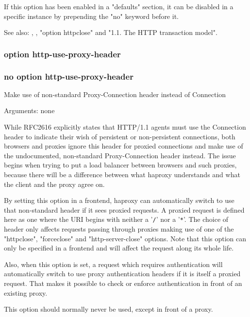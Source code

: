   If this option has been enabled in a "defaults" section, it can be disabled
  in a specific instance by prepending the "no" keyword before it.

  See also: , ,
             "option httpclose" and "1.1. The HTTP transaction model".

\subsubsection{option http-use-proxy-header}
\subsubsection{no option http-use-proxy-header}


  Make use of non-standard Proxy-Connection header instead of Connection


  Arguments: none

  While RFC2616 explicitly states that HTTP/1.1 agents must use the
  Connection header to indicate their wish of persistent or non-persistent
  connections, both browsers and proxies ignore this header for proxied
  connections and make use of the undocumented, non-standard Proxy-Connection
  header instead. The issue begins when trying to put a load balancer between
  browsers and such proxies, because there will be a difference between what
  haproxy understands and what the client and the proxy agree on.

  By setting this option in a frontend, haproxy can automatically switch to use
  that non-standard header if it sees proxied requests. A proxied request is
  defined here as one where the URI begins with neither a '\verb|/|' nor a '\verb|*|'. The
  choice of header only affects requests passing through proxies making use of
  one of the "httpclose", "forceclose" and "http-server-close" options. Note
  that this option can only be specified in a frontend and will affect the
  request along its whole life.

  Also, when this option is set, a request which requires authentication will
  automatically switch to use proxy authentication headers if it is itself a
  proxied request. That makes it possible to check or enforce authentication in
  front of an existing proxy.

  This option should normally never be used, except in front of a proxy.

